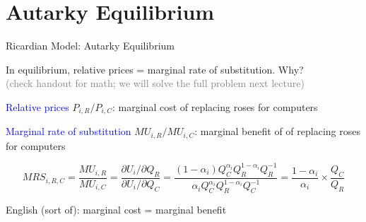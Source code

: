 \documentclass[notes,11pt, aspectratio=169, xcolor=table]{beamer}
\newenvironment{wideitemize}{\itemize\addtolength{\itemsep}{10pt}}{\enditemize}
\begin{document}
\section{Autarky Equilibrium}

\begin{frame}{Ricardian Model: Autarky Equilibrium}


\begin{wideitemize}
    \item In equilibrium, relative prices = marginal rate of substitution. Why? \\
    \qquad \textcolor{gray}{(check handout for math; we will solve the full problem next lecture)}

    \item<2-> \textcolor{blue}{Relative prices} $P_{i,R}/P_{i,C}$: marginal cost of replacing roses for computers

    \item<3-> \textcolor{blue}{Marginal rate of substitution} $MU_{i,R}/MU_{i,C}$: marginal benefit of of replacing roses for computers

    \begin{equation*}
        MRS_{i,R,C} = \frac{MU_{i,R}}{MU_{i,C}} = \frac{ \partial U_i / \partial Q_R }{\partial U_i / \partial Q_C  } = \frac{ (1-\alpha_i ) Q_C^{\alpha_i} Q_R^{1-\alpha_i} Q_{R}^{-1} }{ \alpha_i  Q_C^{\alpha_i} Q_R^{1-\alpha_i} Q_{C}^{-1} } = \frac{1-\alpha_i}{\alpha_i} \times \frac{Q_C}{Q_R}
    \end{equation*}


    \item<4-> English (sort of): marginal cost = marginal benefit 
    \end{wideitemize}

\end{frame}
\end{document}
